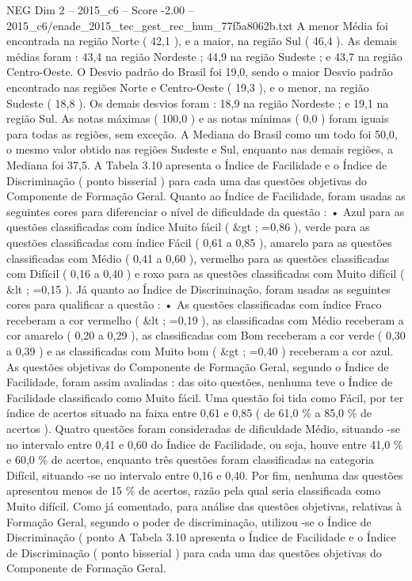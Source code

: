 \begin{textsample}{NEG Dim 2 – 2015\_c6 – Score -2.00 – 2015\_c6/enade\_2015\_tec\_gest\_rec\_hum\_77f5a8062b.txt}
A menor Média foi encontrada na região Norte ( 42,1 ), e a maior, na região Sul ( 46,4 ).
As demais médias foram : 43,4 na região Nordeste ; 44,9 na região Sudeste ; e 43,7 na região Centro-Oeste.
O Desvio padrão do Brasil foi 19,0, sendo o maior Desvio padrão encontrado nas regiões Norte e Centro-Oeste ( 19,3 ), e o menor, na região Sudeste ( 18,8 ).
Os demais desvios foram : 18,9 na região Nordeste ; e 19,1 na região Sul.
As notas máximas ( 100,0 ) e as notas mínimas ( 0,0 ) foram iguais para todas as regiões, sem exceção.
A Mediana do Brasil como um todo foi 50,0, o mesmo valor obtido nas regiões Sudeste e Sul, enquanto nas demais regiões, a Mediana foi 37,5.
A Tabela 3.10 apresenta o Índice de Facilidade e o Índice de Discriminação ( ponto bisserial ) para cada uma das questões objetivas do Componente de Formação Geral.
Quanto ao Índice de Facilidade, foram usadas as seguintes cores para diferenciar o nível de dificuldade da questão : • Azul para as questões classificadas com índice Muito fácil ( \&gt ; =0,86 ), verde para as questões classificadas com índice Fácil ( 0,61 a 0,85 ), amarelo para as questões classificadas com Médio ( 0,41 a 0,60 ), vermelho para as questões classificadas com Difícil ( 0,16 a 0,40 ) e roxo para as questões classificadas com Muito difícil ( \&lt ; =0,15 ).
Já quanto ao Índice de Discriminação, foram usadas as seguintes cores para qualificar a questão : • As questões classificadas com índice Fraco receberam a cor vermelho ( \&lt ; =0,19 ), as classificadas com Médio receberam a cor amarelo ( 0,20 a 0,29 ), as classificadas com Bom receberam a cor verde ( 0,30 a 0,39 ) e as classificadas com Muito bom ( \&gt ; =0,40 ) receberam a cor azul.
As questões objetivas do Componente de Formação Geral, segundo o Índice de Facilidade, foram assim avaliadas : das oito questões, nenhuma teve o Índice de Facilidade classificado como Muito fácil.
Uma questão foi tida como Fácil, por ter índice de acertos situado na faixa entre 0,61 e 0,85 ( de 61,0 \% a 85,0 \% de acertos ).
Quatro questões foram consideradas de dificuldade Médio, situando -se no intervalo entre 0,41 e 0,60 do Índice de Facilidade, ou seja, houve entre 41,0 \% e 60,0 \% de acertos, enquanto três questões foram classificadas na categoria Difícil, situando -se no intervalo entre 0,16 e 0,40.
Por fim, nenhuma das questões apresentou menos de 15 \% de acertos, razão pela qual seria classificada como Muito difícil.
Como já comentado, para análise das questões objetivas, relativas à Formação Geral, segundo o poder de discriminação, utilizou -se o Índice de Discriminação ( ponto A Tabela 3.10 apresenta o Índice de Facilidade e o Índice de Discriminação ( ponto bisserial ) para cada uma das questões objetivas do Componente de Formação Geral.

\end{textsample}
